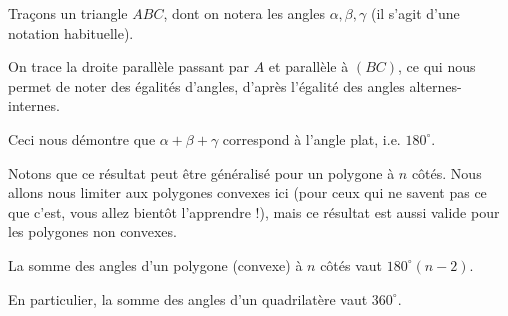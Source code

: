 \begin{preuve}
Traçons un triangle $ABC$, dont on notera les angles $\alpha, \beta, \gamma$ (il s'agit d'une notation habituelle).
\begin{figure}[H]
\end{figure}
On trace la droite parallèle passant par $A$ et parallèle à $(BC)$, ce qui nous permet de noter des égalités d'angles, d'après l'égalité des angles alternes-internes.
\begin{figure}[H]
\end{figure}
Ceci nous démontre que $\alpha + \beta + \gamma$ correspond à l'angle plat, i.e. $180^\circ$.
\end{preuve}

Notons que ce résultat peut être généralisé pour un polygone à $n$ côtés. Nous allons nous limiter aux polygones convexes ici (pour ceux qui ne savent pas ce que c'est, vous allez bientôt l'apprendre !), mais ce résultat est aussi valide pour les polygones non convexes.

\begin{thm}
La somme des angles d'un polygone (convexe) à $n$ côtés vaut $180^\circ(n-2)$.

En particulier, la somme des angles d'un quadrilatère vaut $360^\circ$.
\end{thm}


